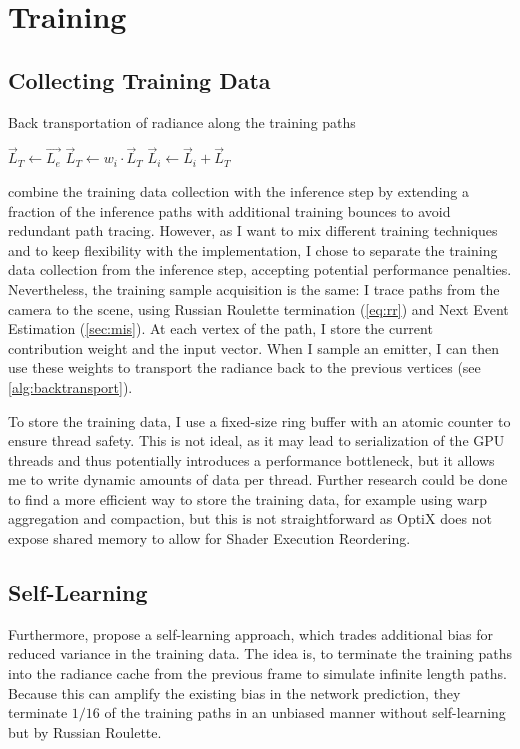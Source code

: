\section{Training}

\subsection{Collecting Training Data}
\begin{algorithm}
    \caption{Back transportation of radiance along the training paths}
    \label{alg:backtransport}
    \begin{algorithmic}
        \State $\vec{L}_T \gets \vec{L_e}$
            \State $\vec{L}_T \gets w_i \cdot \vec{L}_T$ 
            \State $\vec{L}_i \gets \vec{L}_i + \vec{L}_T$ 
        \EndFor
    \end{algorithmic}
\end{algorithm}
\textcite{muller2021} combine the training data collection with the inference step by extending a fraction of the inference paths with additional training bounces to avoid redundant path tracing.
However, as I want to mix different training techniques and to keep flexibility with the implementation, I chose to separate the training data collection from the inference step, accepting potential performance penalties.
Nevertheless, the training sample acquisition is the same:
I trace paths from the camera to the scene, using Russian Roulette termination (\autoref{eq:rr}) and Next Event Estimation (\autoref{sec:mis}).
At each vertex of the path, I store the current contribution weight and the input vector.
When I sample an emitter, I can then use these weights to transport the radiance back to the previous vertices (see \autoref{alg:backtransport}).

To store the training data, I use a fixed-size ring buffer with an atomic counter to ensure thread safety.
This is not ideal, as it may lead to serialization of the GPU threads and thus potentially introduces a performance bottleneck, but it allows me to write dynamic amounts of data per thread.
Further research could be done to find a more efficient way to store the training data, for example using warp aggregation and compaction, but this is not straightforward as OptiX does not expose shared memory to allow for Shader Execution Reordering.

\subsection{Self-Learning}
Furthermore, \textcite{muller2021} propose a self-learning approach, which trades additional bias for reduced variance in the training data.
The idea is, to terminate the training paths into the radiance cache from the previous frame to simulate infinite length paths.
Because this can amplify the existing bias in the network prediction, they terminate $1/16$ of the training paths in an unbiased manner without self-learning but by Russian Roulette.

